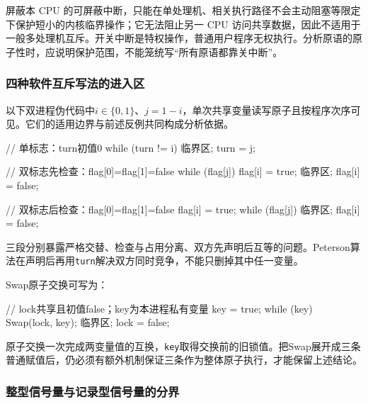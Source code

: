 屏蔽本 CPU 的可屏蔽中断，只能在单处理机、相关执行路径不会主动阻塞等限定下保护短小的内核临界操作；它无法阻止另一 CPU 访问共享数据，因此不适用于一般多处理机互斥。开关中断是特权操作，普通用户程序无权执行。分析原语的原子性时，应说明保护范围，不能笼统写``所有原语都靠关中断''。

\subsubsection{四种软件互斥写法的进入区}\label{OS02-software-code}

以下双进程伪代码中\(i\in\{0,1\}\)、\(j=1-i\)，单次共享变量读写原子且按程序次序可见。它们的适用边界与前述反例共同构成分析依据。

\par\medskip\noindent\begin{minipage}{\linewidth}
\begin{codeblock}[language={}]
// 单标志：turn初值0
while (turn != i) { }
临界区;
turn = j;

// 双标志先检查：flag[0]=flag[1]=false
while (flag[j]) { }
flag[i] = true;
临界区;
flag[i] = false;

// 双标志后检查：flag[0]=flag[1]=false
flag[i] = true;
while (flag[j]) { }
临界区;
flag[i] = false;
\end{codeblock}
\end{minipage}\par\medskip

三段分别暴露严格交替、检查与占用分离、双方先声明后互等的问题。Peterson算法在声明后再用\texttt{turn}解决双方同时竞争，不能只删掉其中任一变量。

Swap原子交换可写为：

\par\medskip\noindent\begin{minipage}{\linewidth}
\begin{codeblock}[language={}]
// lock共享且初值false；key为本进程私有变量
key = true;
while (key) Swap(lock, key);
临界区;
lock = false;
\end{codeblock}
\end{minipage}\par\medskip

原子交换一次完成两变量值的互换，\texttt{key}取得交换前的旧锁值。把Swap展开成三条普通赋值后，仍必须有额外机制保证三条作为整体原子执行，才能保留上述结论。

\subsubsection{整型信号量与记录型信号量的分界}\label{OS02-integer-semaphore}

